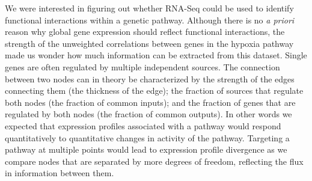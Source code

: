 \documentclass[9pt,twocolumn,twoside]{pnas-new}
\begin{document}
We were interested in figuring out whether RNA-Seq could be used to identify functional interactions within a genetic pathway. Although there is no \emph{a priori} reason why global gene expression should reflect functional interactions, the strength of the unweighted correlations between genes in the hypoxia pathway made us wonder how much information can be extracted from this dataset. Single genes are often regulated by multiple independent sources. The connection between two nodes can in theory be characterized by the strength of the edges connecting them (the thickness of the edge); the fraction of sources that regulate both nodes (the fraction of common inputs); and the fraction of genes that are regulated by both nodes (the fraction of common outputs).
In other words we expected that expression profiles associated with a pathway would respond quantitatively to quantitative changes in activity of the pathway. Targeting a pathway at multiple points would lead to expression profile divergence as we compare nodes that are separated by more degrees of freedom, reflecting the flux in information between them.
\end{document}
